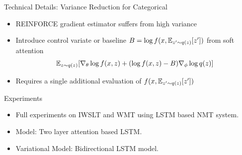 \begin{frame}{Technical Details: Variance Reduction for Categorical}
\begin{itemize}
    \item REINFORCE gradient estimator suffers from high variance
    \air
    \item Introduce control variate or baseline $B = \log f(x, \mathbb{E}_{z'\sim q(z)}[z'])$ from soft attention
    \[ \mathbb{E}_{z \sim q(z)} [\nabla_\theta\log f(x,z) + ( \log f(x,z) -
  B)\nabla_\phi \log q(z) ] \]
    \item Requires a single additional evaluation of $f(x,\mathbb{E}_{z'\sim q(z)}[z'])$
\end{itemize}
\end{frame}



\begin{frame}
  {Experiments}

  \begin{itemize}
  \item Full experiments on IWSLT and WMT using LSTM based NMT system.
  \item Model: Two layer attention based LSTM.
  \item Variational Model: Bidirectional LSTM model.
  \end{itemize}
\end{frame}


